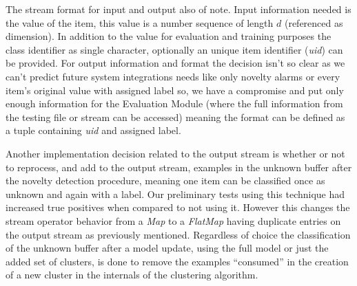 The stream format for input and output also of note.
Input information needed is the value of the item, this value is a number
sequence of length $d$ (referenced as dimension).
In addition to the value for evaluation and training purposes the class
identifier as single character, optionally an unique item identifier
(\textit{uid}) can be provided.
For output information and format the decision isn't so clear as we can't
predict future system integrations needs like only novelty alarms or every
item's original value with assigned label so, we have a compromise and put only
enough information for the Evaluation Module (where the full information
from the testing file or stream can be accessed) meaning the format can be
defined as a tuple containing \textit{uid} and assigned label.


Another implementation decision related to the output stream is whether or not
to reprocess, and add to the output stream, examples in the unknown buffer after
the novelty detection procedure, meaning one item can be classified once as
unknown and again with a label.
Our preliminary tests using this technique had increased true positives when compared to
not using it.
However this changes the stream operator behavior from a \textit{Map} to a
\textit{FlatMap} having duplicate entries on the output stream as previously
mentioned.
Regardless of choice the classification of the unknown buffer after a model
update, using the full model or just the added set of clusters, is done to
remove the examples ``consumed'' in the creation of a new cluster in the internals
of the clustering algorithm.


